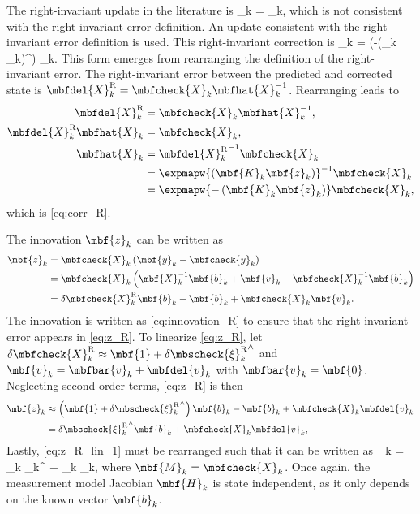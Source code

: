 The right-invariant update in the literature is
\bdis
	_k = _k,
\edis
which is not consistent with the right-invariant error definition. An update consistent with the right-invariant error definition is used. This right-invariant correction is 
\beq
	_k = \exp\left(-\left(_k _k\right)^\wedge\right) _k.
	\label{eq:corr_R} 
\eeq
This form emerges from rearranging the definition of the right-invariant error. The right-invariant error between the predicted and corrected state is $\mbfdel{X}_k^\textrm{R} = \mbfcheck{X}_k\mbfhat{X}_k^{-1}$. Rearranging leads to
\begin{align}
	\mbfdel{X}_k^\textrm{R} &= \mbfcheck{X}_k\mbfhat{X}_k^{-1}, \notag \\
	\mbfdel{X}_k^\textrm{R}\mbfhat{X}_k &= \mbfcheck{X}_k, \notag \\
	\mbfhat{X}_k &=  {\mbfdel{X}_k^\textrm{R}}^{-1}\mbfcheck{X}_k \notag \\
	&= \expmapw{\left(\mbf{K}_k\mbf{z}_k\right)}^{-1}\mbfcheck{X}_k \notag \\
	&= \expmapw{-\left(\mbf{K}_k\mbf{z}_k\right)} \mbfcheck{X}_k, \notag
\end{align}
which is \eqref{eq:corr_R}.

The innovation $\mbf{z}_k$ can be written as
\begin{align}
	\mbf{z}_k & = \mbfcheck{X}_k\left(\mbf{y}_k - \mbfcheck{y}_k\right) \label{eq:innovation_R} \\ 
	& = \mbfcheck{X}_k\left( \mbf{X}_k^{-1}\mbf{b}_k + \mbf{v}_k - \mbfcheck{X}_k^{-1}\mbf{b}_k\right) \nonumber \\
	& = \delta \mbfcheck{X}_k^\mathrm{R}\mbf{b}_k  - \mbf{b}_k + \mbfcheck{X}_k\mbf{v}_k. \label{eq:z_R}
\end{align}
The innovation is written as \eqref{eq:innovation_R} to ensure that the right-invariant error appears in \eqref{eq:z_R}.
To linearize \eqref{eq:z_R}, let $\delta \mbfcheck{X}_k^\mathrm{R} \approx \mbf{1} + \delta {\mbscheck{\xi}_k^\mathrm{R}}^\wedge$ and $\mbf{v}_k = \mbfbar{v}_k + \mbfdel{v}_k$ with $\mbfbar{v}_k = \mbf{0}$. Neglecting second order terms, \eqref{eq:z_R} is then 
\begin{align}
	\mbf{z}_k &\approx \left(\mbf{1} +  \delta {\mbscheck{\xi}_k^\mathrm{R}}^\wedge\right)\mbf{b}_k - \mbf{b}_k + \mbfcheck{X}_k\mbfdel{v}_k \nonumber \\
	 & = \delta {\mbscheck{\xi}_k^\mathrm{R}}^\wedge\mbf{b}_k + \mbfcheck{X}_k\mbfdel{v}_k, \label{eq:z_R_lin_1}
\end{align}
Lastly, \eqref{eq:z_R_lin_1} must be rearranged such that it can be written as 
\beq
	_k  =  _k \delta \mbscheck{\xi}_k^ + _k _k,
\label{eq:z_R_lin}
\eeq
where $\mbf{M}_k = \mbfcheck{X}_k$. Once again, the measurement model Jacobian $\mbf{H}_k$ is state independent, as it only depends on the known vector $\mbf{b}_k$.


